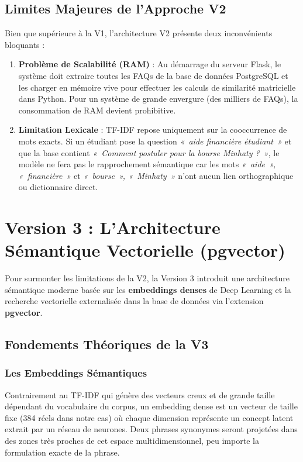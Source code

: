 \documentclass[11pt,a4paper]{article}
\begin{document}
\subsection{Limites Majeures de l'Approche V2}
Bien que supérieure à la V1, l'architecture V2 présente deux inconvénients bloquants :
\begin{enumerate}
    \item \textbf{Problème de Scalabilité (RAM)} : Au démarrage du serveur Flask, le système doit extraire toutes les FAQs de la base de données PostgreSQL et les charger en mémoire vive pour effectuer les calculs de similarité matricielle dans Python. Pour un système de grande envergure (des milliers de FAQs), la consommation de RAM devient prohibitive.
    \item \textbf{Limitation Lexicale} : TF-IDF repose uniquement sur la cooccurrence de mots exacts. Si un étudiant pose la question \textit{«~aide financière étudiant~»} et que la base contient \textit{«~Comment postuler pour la bourse Minhaty ?~»}, le modèle ne fera pas le rapprochement sémantique car les mots \textit{«~aide~», «~financière~»} et \textit{«~bourse~», «~Minhaty~»} n'ont aucun lien orthographique ou dictionnaire direct.
\end{enumerate}

\clearpage

\section[V3 : Recherche Sémantique]{Version 3 : L'Architecture Sémantique Vectorielle (pgvector)}

Pour surmonter les limitations de la V2, la Version 3 introduit une architecture sémantique moderne basée sur les \textbf{embeddings denses} de Deep Learning et la recherche vectorielle externalisée dans la base de données via l'extension \textbf{pgvector}.

\subsection{Fondements Théoriques de la V3}

\subsubsection{Les Embeddings Sémantiques}
Contrairement au TF-IDF qui génère des vecteurs creux et de grande taille dépendant du vocabulaire du corpus, un embedding dense est un vecteur de taille fixe (384 réels dans notre cas) où chaque dimension représente un concept latent extrait par un réseau de neurones. Deux phrases synonymes seront projetées dans des zones très proches de cet espace multidimensionnel, peu importe la formulation exacte de la phrase.
\end{document}
